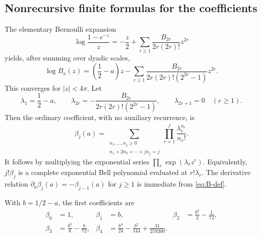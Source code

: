 \documentclass[11pt,a4paper]{article}
\numberwithin{equation}{section}
\theoremstyle{definition}
\theoremstyle{remark}
\newcommand{\abs}[1]{\left|#1\right|}
\begin{document}
\subsection{Nonrecursive finite formulas for the coefficients}
The elementary Bernoulli expansion
\[
 \log\frac{1-e^{-z}}z
 =-\frac z2+\sum_{r\ge1}\frac{B_{2r}}{2r(2r)!}z^{2r}
\]
yields, after summing over dyadic scales,
\begin{equation}
 \log B_a(z)=\left(\frac12-a\right)z
 -\sum_{r\ge1}
 \frac{B_{2r}}{2r(2r)!(2^{2r}-1)}z^{2r}.
 \label{eq:log-B}
\end{equation}
This converges for $\abs z<4\pi$. Let
\begin{equation}
 \lambda_1=\frac12-a,\qquad
 \lambda_{2r}=-\frac{B_{2r}}{2r(2r)!(2^{2r}-1)},\qquad
 \lambda_{2r+1}=0\quad(r\ge1).
 \label{eq:lambdas}
\end{equation}
Then the ordinary coefficient, with no auxiliary recurrence, is
\begin{equation}
 \boxed{\displaystyle
 \beta_j(a)=
 \sum_{\substack{n_1,\ldots,n_j\ge0\\
                  n_1+2n_2+\cdots+jn_j=j}}
 \prod_{r=1}^j\frac{\lambda_r^{n_r}}{n_r!}.}
 \label{eq:beta-finite}
\end{equation}
It follows by multiplying the exponential series
$\prod_r\exp(\lambda_rz^r)$. Equivalently, $j!\beta_j$ is a complete
exponential Bell polynomial evaluated at $r!\lambda_r$.
The derivative relation
$\partial_a\beta_j(a)=-\beta_{j-1}(a)$ for $j\ge1$ is immediate
from \cref{eq:B-def}.

With $b=1/2-a$, the first coefficients are
\begin{align}
 \beta_0&=1,& \beta_1&=b,&
 \beta_2&=\frac{b^2}{2}-\frac1{72},\nonumber\\
 \beta_3&=\frac{b^3}{6}-\frac b{72},&
 \beta_4&=\frac{b^4}{24}-\frac{b^2}{144}
              +\frac{31}{259200}.
 \label{eq:beta-first}
\end{align}
\end{document}
